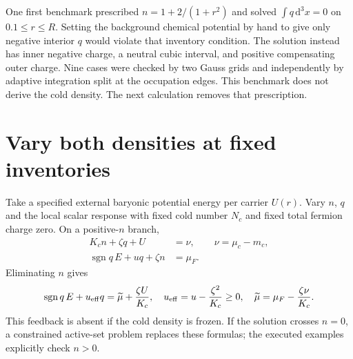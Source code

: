 \documentclass[11pt]{article}
\newcommand{\dd}{\mathrm d}
\begin{document}
One first benchmark prescribed $n=1+2/(1+r^2)$ and solved
$\int q\,\dd^3x=0$ on $0.1\leq r\leq R$. Setting the background
chemical potential by hand to give only negative interior $q$ would violate
that inventory condition. The solution instead has inner negative charge,
a neutral cubic interval, and positive compensating outer charge.
Nine cases were checked by two Gauss grids and independently by adaptive
integration split at the occupation edges. This benchmark does not derive
the cold density. The next calculation removes that prescription.

\section{Vary both densities at fixed inventories}
Take a specified external baryonic potential energy per carrier $U(r)$.
Vary $n$, $q$ and the local scalar response with fixed cold number $N_c$
and fixed total fermion charge zero. On a positive-$n$ branch,
\begin{align}
 K_cn+\zeta q+U&=\nu,\qquad \nu=\mu_c-m_c,\\
 \operatorname{sgn}q\,E+u q+\zeta n&=\mu_F.
\end{align}
Eliminating $n$ gives
\begin{equation}
 \operatorname{sgn}q\,E+u_{\rm eff}q
       =\widetilde\mu+{\zeta U\over K_c},\quad
 u_{\rm eff}=u-{\zeta^2\over K_c}\geq0,\quad
 \widetilde\mu=\mu_F-{\zeta\nu\over K_c}.
 \label{rb:eliminate}
\end{equation}
This feedback is absent if the cold density is frozen. If the solution
crosses $n=0$, a constrained active-set problem replaces these formulas;
the executed examples explicitly check $n>0$.
\end{document}
